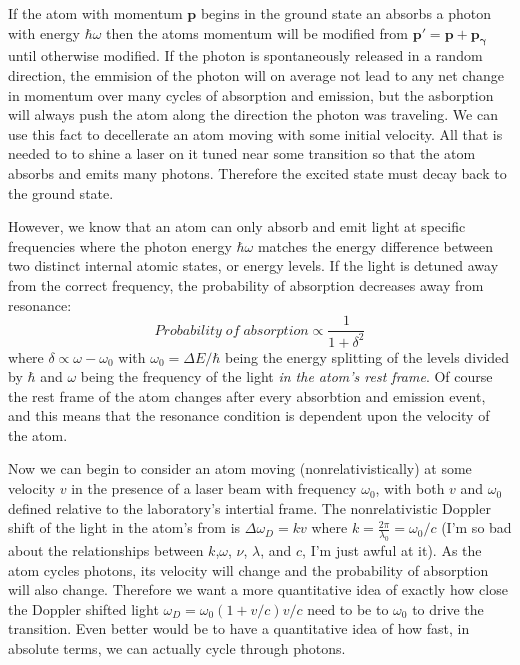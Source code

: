 \documentclass[../../main.tex]{subfiles}
\begin{document}
If the atom with momentum $\mathbf{p}$ begins in the ground state an absorbs a photon with energy $\hbar\omega$ then the atoms momentum will be modified from $\mathbf{p}'=\mathbf{p}+\mathbf{p_\gamma}$  until otherwise modified. If the photon is spontaneously released in a random direction, the emmision of the photon will on average not lead to any net change in momentum over many cycles of absorption and emission, but the asborption will always push the atom along the direction the photon was traveling. We can use this fact to decellerate an atom moving with some initial velocity. All that is needed to to shine a laser on it tuned near some transition so that the atom absorbs and emits many photons. Therefore the excited state must decay back to the ground state.

However, we know that an atom can only absorb and emit light at specific frequencies where the photon energy $\hbar \omega$ matches the energy difference between two distinct internal atomic states, or energy levels. If the light is detuned away from the correct frequency, the probability  of absorption decreases away from resonance: $$Probability\; of\; absorption \propto \frac{1}{1+\delta^2}$$ where $\delta \propto \omega-\omega_0$ with $\omega_0=\Delta E/\hbar$ being the energy splitting of the levels divided by $\hbar$ and $\omega$ being the frequency of the light \textit{in the atom's rest frame}. Of course the rest frame of the atom changes after every absorbtion and emission event, and this means that the resonance condition is dependent upon the velocity of the atom. 

Now we can begin to consider an atom moving (nonrelativistically) at some velocity $v$  in the presence of a laser beam with frequency $\omega_0$, with both $v$ and $\omega_0$ defined relative to the laboratory's intertial frame. The nonrelativistic Doppler shift of the light in the atom's from is $\Delta\omega_D=kv$ where $k=\frac{2\pi}{\lambda_0}=\omega_0/c$ (I'm so bad about the relationships between $k$,$\omega$, $\nu$, $\lambda$, and $c$, I'm just awful at it). As the atom cycles photons, its velocity will change and the probability of absorption will also change. Therefore we want a more quantitative idea of exactly how close the Doppler shifted light $\omega_D=\omega_0(1+v/c) v/c$ need to be to $\omega_0$ to drive the transition. Even better would be to have a quantitative idea of how fast, in absolute terms, we can actually cycle through photons. 
\end{document}
